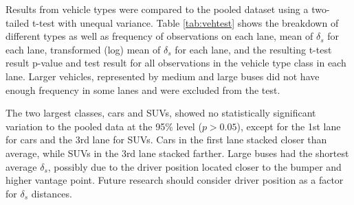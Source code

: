 \documentclass[preprint,12pt,a4paper]{elsarticle}
\begin{document}
\begin{linenumbers}
Results from vehicle types were compared to the pooled dataset using a two-tailed t-test with unequal variance. Table \ref{tab:vehtest} shows the breakdown of different types as well as frequency of observations on each lane, mean of  $\delta_{s}$ for each lane, transformed (log) mean of  $\delta_{s}$ for each lane, and the resulting t-test result p-value and test result for all observations in the vehicle type class in each lane. Larger vehicles, represented by medium and large buses did not have enough frequency in some lanes and were excluded from the test. 

\begin{table}[H]
\centering
\caption{Results of significance testing of individual vehicle types and pooled data.}
\label{tab:vehtest}
\end{table}

The two largest classes, cars and SUVs, showed no statistically significant variation to the pooled data at the 95\% level ($p>0.05$), except for the 1st lane for cars and the 3rd lane for SUVs. Cars in the first lane stacked closer than average, while SUVs in the 3rd lane stacked farther. Large buses had the shortest average $\delta_{s}$, possibly due to the driver position located closer to the bumper and higher vantage point. Future research should consider driver position as a factor for $\delta_{s}$ distances.



\end{linenumbers}
\end{document}
